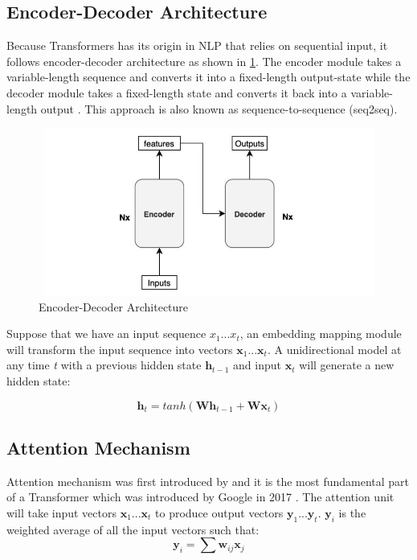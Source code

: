 \subsection{Encoder-Decoder Architecture} \label{subsection: encoder-decoder}

Because Transformers has its origin in NLP that relies on sequential input, it follows encoder-decoder architecture as shown in \ref{fig:encoder-decoder}. The encoder module takes a variable-length sequence and converts it into a fixed-length output-state while the decoder module takes a fixed-length state and converts it back into a variable-length output \cite{attention}. This approach is also known as sequence-to-sequence (seq2seq).
\FloatBarrier
\begin{figure}[ht]
\includegraphics[width=13.5cm, height=5.5cm]{images/encodeer-decoder.jpg}
\centering
\caption{Encoder-Decoder Architecture \protect\cite{attention}}
\label{fig:encoder-decoder}
\end{figure}
\FloatBarrier


Suppose that we have an input sequence $x_1...x_t$, an embedding mapping module will transform the input sequence into vectors $\mathbf{x}_1...\mathbf{x}_t$. A unidirectional model at any time \textit{t} with a previous hidden state $\mathbf{h}_{t-1}$ and input $\mathbf{x}_t$ will generate a new hidden state:

\begin{equation}
    \mathbf{h}_t = tanh(\mathbf{Wh}_{t-1} + \mathbf{Wx}_t)
\end{equation}

\subsection{Attention Mechanism}

Attention mechanism was first introduced by  and it is the most fundamental part of a Transformer which was introduced by Google in 2017 . The attention unit will take input vectors $\mathbf{x}_1...\mathbf{x}_t$ to produce output vectors $\mathbf{y}_1...\mathbf{y}_t$. $\mathbf{y}_i$ is the weighted average of all the input vectors such that:
\begin{equation}
    \mathbf{y}_i = \sum \mathbf{w}_{ij}\mathbf{x}_j
\end{equation}

